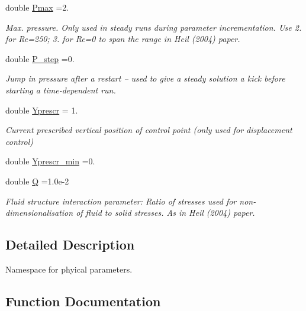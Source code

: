\begin{DoxyCompactItemize}
double \hyperlink{namespaceGlobal__Physical__Variables_a3e094a3c45284edb77a880f49c93f94b}{Pmax} =2.
\begin{DoxyCompactList}\small\item\em Max. pressure. Only used in steady runs during parameter incrementation. Use 2. for Re=250; 3. for Re=0 to span the range in Heil (2004) paper. \end{DoxyCompactList}\item 
double \hyperlink{namespaceGlobal__Physical__Variables_aa1a76edebe4c23344938421cd68f0a8b}{P\+\_\+step} =0.
\begin{DoxyCompactList}\small\item\em Jump in pressure after a restart -- used to give a steady solution a kick before starting a time-\/dependent run. \end{DoxyCompactList}\item 
double \hyperlink{namespaceGlobal__Physical__Variables_afd29cc714595594020831c7c54387883}{Yprescr} = 1.
\begin{DoxyCompactList}\small\item\em Current prescribed vertical position of control point (only used for displacement control) \end{DoxyCompactList}\item 
double \hyperlink{namespaceGlobal__Physical__Variables_ad6b457166fefe63a8341e9d0faefe892}{Yprescr\+\_\+min} =0.
\item 
double \hyperlink{namespaceGlobal__Physical__Variables_a66cb7ecda9ba0cd72367dd697f154545}{Q} =1.\+0e-\/2
\begin{DoxyCompactList}\small\item\em Fluid structure interaction parameter\+: Ratio of stresses used for non-\/dimensionalisation of fluid to solid stresses. As in Heil (2004) paper. \end{DoxyCompactList}\end{DoxyCompactItemize}


\subsection{Detailed Description}
Namespace for phyical parameters. 

\subsection{Function Documentation}
\mbox{\label{namespaceGlobal__Physical__Variables_a321267e1efb30b5d586302509354fb07}} 
